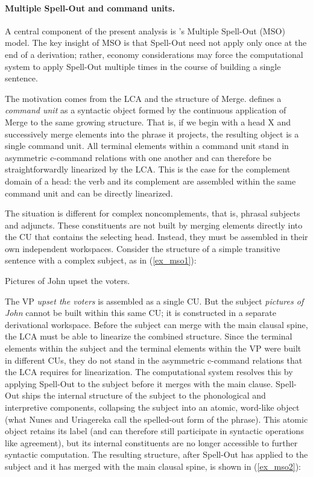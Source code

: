\documentclass[12pt]{article}
\begin{document}
\paragraph{Multiple Spell-Out and command units.} A central component of the present analysis is \citeauthor{uriagereka1999}’s \citeyearpar{uriagereka1999} Multiple Spell-Out (MSO) model. The key insight of MSO is that Spell-Out need not apply only once at the end of a derivation; rather, economy considerations may force the computational system to apply Spell-Out multiple times in the course of building a single sentence.

The motivation comes from the LCA and the structure of Merge. \citeauthor{uriagereka1999} defines a \textit{command unit} as a syntactic object formed by the continuous application of Merge to the same growing structure. That is, if we begin with a head X and successively merge elements into the phrase it projects, the resulting object is a single command unit. All terminal elements within a command unit stand in asymmetric c-command relations with one another and can therefore be straightforwardly linearized by the LCA. This is the case for the complement domain of a head: the verb and its complement are assembled within the same command unit and can be directly linearized.

The situation is different for complex noncomplements, that is, phrasal subjects and adjuncts. These constituents are not built by merging elements directly into the CU that contains the selecting head. Instead, they must be assembled in their own independent workspaces. Consider the structure of a simple transitive sentence with a complex subject, as in (\ref{ex_mso1}):

\ex \label{ex_mso1}
Pictures of John upset the voters.
\xe

\noindent
The VP \textit{upset the voters} is assembled as a single CU. But the subject \textit{pictures of John} cannot be built within this same CU; it is constructed in a separate derivational workspace. Before the subject can merge with the main clausal spine, the LCA must be able to linearize the combined structure. Since the terminal elements within the subject and the terminal elements within the VP were built in different CUs, they do not stand in the asymmetric c-command relations that the LCA requires for linearization. The computational system resolves this by applying Spell-Out to the subject before it merges with the main clause. Spell-Out ships the internal structure of the subject to the phonological and interpretive components, collapsing the subject into an atomic, word-like object (what Nunes and Uriagereka call the spelled-out form of the phrase). This atomic object retains its label (and can therefore still participate in syntactic operations like agreement), but its internal constituents are no longer accessible to further syntactic computation. The resulting structure, after Spell-Out has applied to the subject and it has merged with the main clausal spine, is shown in (\ref{ex_mso2}):
\end{document}
